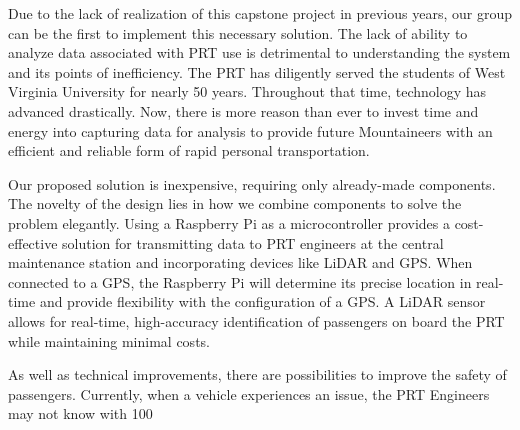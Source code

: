 Due to the lack of realization of this capstone project in previous years, our group can be the first to implement this necessary solution. The lack of ability to analyze data associated with PRT use is detrimental to understanding the system and its points of inefficiency. The PRT has diligently served the students of West Virginia University for nearly 50 years. Throughout that time, technology has advanced drastically. Now, there is more reason than ever to invest time and energy into capturing data for analysis to provide future Mountaineers with an efficient and reliable form of rapid personal transportation.

Our proposed solution is inexpensive, requiring only already-made components. The novelty of the design lies in how we combine components to solve the problem elegantly. Using a Raspberry Pi as a microcontroller provides a cost-effective solution for transmitting data to PRT engineers at the central maintenance station and incorporating devices like LiDAR and GPS. When connected to a GPS, the Raspberry Pi will determine its precise location in real-time and provide flexibility with the configuration of a GPS. A LiDAR sensor allows for real-time, high-accuracy identification of passengers on board the PRT while maintaining minimal costs.

As well as technical improvements, there are possibilities to improve the safety of passengers. Currently, when a vehicle experiences an issue, the PRT Engineers may not know with 100%

